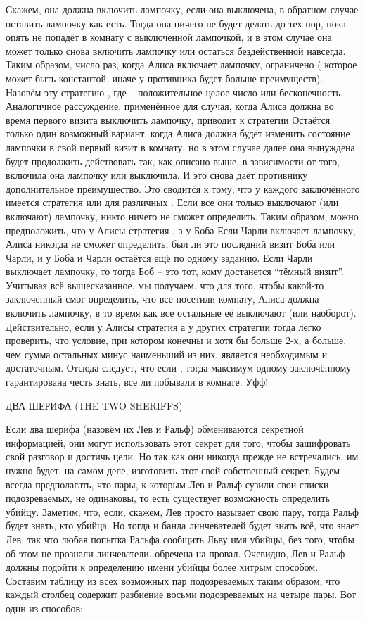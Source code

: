 Скажем, она должна включить лампочку, если она выключена, в обратном случае оставить лампочку как есть. Тогда она ничего не будет делать до тех пор, пока опять не попадёт в комнату с выключенной лампочкой, и в этом случае она может только снова включить лампочку или остаться бездейственной навсегда. Таким образом, число раз, когда Алиса включает лампочку, ограничено ( которое может быть константой, иначе у противника будет больше преимуществ). Назовём эту стратегию , где  -- положительное целое число или бесконечность. Аналогичное рассуждение, применённое для случая, когда Алиса должна во время первого визита выключить лампочку, приводит к стратегии 
   Остаётся только один возможный вариант, когда Алиса должна будет изменить состояние лампочки в свой первый визит в комнату, но в этом случае  далее она вынуждена будет продолжить действовать так, как  описано выше, в зависимости от того, включила она лампочку или выключила. И это снова даёт противнику дополнительное преимущество.
   Это сводится к тому, что у каждого заключённого имеется стратегия  или  для различных . Если все они только выключают (или включают) лампочку, никто ничего не сможет определить. Таким образом, можно предположить, что у Алисы стратегия , а у Боба  Если Чарли включает лампочку, Алиса никогда не сможет определить, был ли это последний визит Боба или Чарли, и у Боба и Чарли остаётся ещё по одному заданию. Если Чарли выключает лампочку, то тогда  Боб -- это тот, кому достанется “тёмный визит”.
   Учитывая всё вышесказанное, мы получаем, что для того, чтобы какой-то заключённый смог определить, что все посетили комнату, Алиса должна включить лампочку, в то время как все остальные её выключают (или наоборот). Действительно, если  у Алисы стратегия  а у других стратегии  тогда легко проверить, что условие, при котором конечны  и хотя бы больше 2-х, а больше, чем сумма остальных  минус наименьший из них, является необходимым и достаточным.
  Отсюда следует, что если , тогда максимум одному заключённому гарантирована честь знать, все ли побывали в комнате.
  Уфф!




ДВА ШЕРИФА (ТHE TWO SHERIFFS)


   Если два шерифа (назовём их Лев и Ральф) обмениваются секретной информацией, они могут использовать этот секрет для того, чтобы зашифровать свой разговор и достичь цели. Но так как они никогда прежде не встречались, им нужно будет, на самом деле, изготовить этот свой собственный секрет.
  Будем всегда предполагать, что пары, к которым Лев и Ральф сузили свои списки подозреваемых, не одинаковы, то есть существует возможность определить убийцу. Заметим, что,  если, скажем, Лев просто называет свою пару, тогда Ральф будет знать, кто убийца. Но тогда и банда линчевателей будет знать всё, что знает Лев, так что любая попытка Ральфа сообщить Льву имя убийцы, без того, чтобы об этом не прознали линчеватели, обречена на провал.
  Очевидно, Лев и Ральф должны подойти к определению имени убийцы более хитрым способом. Составим таблицу из всех  возможных пар подозреваемых таким образом, что каждый столбец содержит разбиение восьми подозреваемых на четыре пары. Вот один из способов:
     
